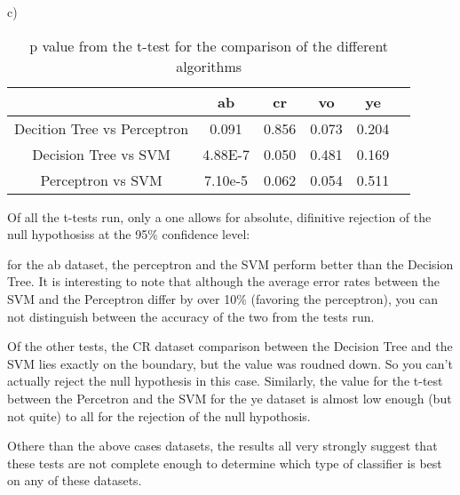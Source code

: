 \documentclass[12pt]{article}
\begin{document}
c) 
\begin{table}[ht!]
    \begin{tabular}{|c|c|c|c|c|c|} \hline
                                & ab      & cr       & vo      & ye\\ \hline
    Decition Tree vs Perceptron & 0.091   & 0.856    & 0.073   &0.204\\ \hline
    Decision Tree vs SVM        & 4.88E-7 & 0.050    & 0.481   &0.169\\ \hline
    Perceptron vs SVM           & 7.10e-5 & 0.062    & 0.054   &0.511\\ \hline  
    \hline
    \end{tabular}
    \caption{p value from the t-test for the comparison of the different algorithms }
\end{table}

Of all the t-tests run, only a one allows for absolute, difinitive rejection of the null 
hypothosiss at the 95\% confidence level: 

for the ab dataset, the perceptron and the SVM perform better than the Decision Tree. 
It is interesting to note that although the average error rates between the SVM and the Perceptron
differ by over 10\% (favoring the perceptron), you can not distinguish between the accuracy of the two 
from the tests run. 

Of the other tests, the CR dataset comparison between the Decision Tree and the SVM lies exactly 
on the boundary, but the value was roudned down. So you can't actually reject the null hypothesis
in this case. Similarly, the value for the t-test between the Percetron and the SVM for the ye 
dataset is almost low enough (but not quite) to all for the rejection of the null hypothosis. 

Othere than the above cases datasets, the results all very strongly suggest that these tests are not 
complete enough to determine which type of classifier is best on any of these datasets. 
    
\end{document}
